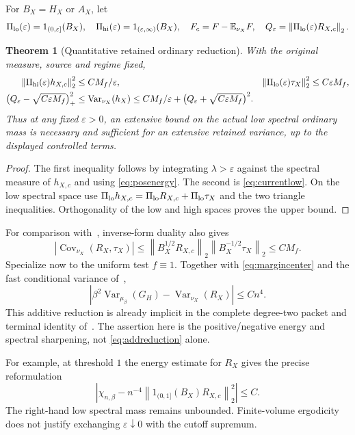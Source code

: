 \documentclass[11pt,letterpaper]{article}
\newtheorem{theorem}{Theorem}[section]
\theoremstyle{remark}\newtheorem{remark}[theorem]{Remark}
\newcommand{\E}{\mathbb E}
\newcommand{\Var}{\operatorname{Var}}\newcommand{\Cov}{\operatorname{Cov}}
\newcommand{\norm}[1]{\left\lVert#1\right\rVert}
\begin{document}
For $B_X=H_X$ or $A_X$, let
\[
 \Pi_{\rm lo}(\varepsilon)=1_{(0,\varepsilon]}(B_X),\quad
 \Pi_{\rm hi}(\varepsilon)=1_{(\varepsilon,\infty)}(B_X),\quad
 F_c=F-\E_{\nu_X}F,\quad
 Q_\varepsilon=\norm{\Pi_{\rm lo}(\varepsilon)R_{X,c}}_2.
\]

\begin{theorem}[Quantitative retained ordinary reduction]\label{thm:maingap}
With the original measure, source and regime fixed,
\begin{align}\label{eq:spectral}
 \norm{\Pi_{\rm hi}(\varepsilon)h_{X,c}}_2^2&\le CM_f/\varepsilon,&
 \norm{\Pi_{\rm lo}(\varepsilon)\tau_X}_2^2&\le C\varepsilon M_f,\\
 \bigl(Q_\varepsilon-\sqrt{C\varepsilon M_f}\bigr)_+^2
 &\le \Var_{\nu_X}(h_X)
 \le CM_f/\varepsilon+
       \bigl(Q_\varepsilon+\sqrt{C\varepsilon M_f}\bigr)^2.\nonumber
\end{align}
Thus at any fixed $\varepsilon>0$, an extensive bound on the actual low spectral ordinary mass is necessary and sufficient for an extensive retained variance, up to the displayed controlled terms.
\end{theorem}
\begin{proof}
The first inequality follows by integrating $\lambda>\varepsilon$ against the spectral measure of $h_{X,c}$ and using \eqref{eq:posenergy}. The second is \eqref{eq:currentlow}. On the low spectral space use
$\Pi_{\rm lo}h_{X,c}=\Pi_{\rm lo}R_{X,c}+\Pi_{\rm lo}\tau_X$ and the two triangle inequalities. Orthogonality of the low and high spaces proves the upper bound.
\end{proof}

For comparison with~\cite[\S\S3--4]{SZ}, inverse-form duality also gives
\[
 |\Cov_{\nu_X}(R_X,\tau_X)|
 \le \norm{B_X^{1/2}R_{X,c}}_2\norm{B_X^{-1/2}\tau_X}_2\le CM_f.
\]
Specialize now to the uniform test $f\equiv1$. Together with \eqref{eq:margincenter} and the fast conditional variance of~\cite[\S3]{SZ},
\begin{equation}\label{eq:addreduction}
 \left|\beta^2\Var_{\mu_\beta}(G_H)-\Var_{\nu_X}(R_X)\right|\le Cn^4.
\end{equation}
This additive reduction is already implicit in the complete degree-two packet and terminal identity of~\cite[\S4]{SZ}. The assertion here is the positive/negative energy and spectral sharpening, not \eqref{eq:addreduction} alone.

For example, at threshold $1$ the energy estimate for $R_X$ gives the precise reformulation
\begin{equation}\label{eq:lowtarget}
 \boxed{\quad
 \left|\chi_{n,\beta}
 -n^{-4}\norm{1_{(0,1]}(B_X)R_{X,c}}_2^2\right|\le C.
 \quad}
\end{equation}
The right-hand low spectral mass remains unbounded. Finite-volume ergodicity does not justify exchanging $\varepsilon\downarrow0$ with the cutoff supremum.
\end{document}
